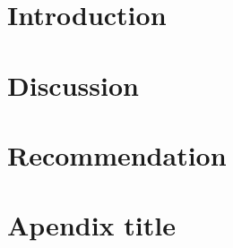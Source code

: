 \documentclass[letterpaper,11pt]{texMemo} %
\begin{document}
\maketitle %

\section*{Introduction}
\section*{Discussion}


\section*{Recommendation}

\newpage
%



\appendix
\newpage
\section*{Apendix title}
\end{document}
